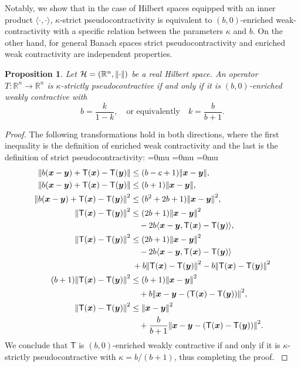\documentclass[journal,twoside,web]{ieeecolor}
\newcommand{\norm}[1]{{\left\vert\kern-0.25ex\left\vert #1\right\vert\kern-0.25ex\right\vert}}
\newcommand{\rea }{\mathbb{R}}
\newcommand{\xb}{\boldsymbol{x}}
\newcommand{\yb}{\boldsymbol{y}}
\newcommand{\Ts}{\mathsf{T}}
\newcommand{\Hc}{\mathcal{H}}
\newtheorem{prop}{Proposition}
\begin{document}
Notably, we show that in the case of Hilbert spaces equipped with an inner product $\langle\cdot,\cdot\rangle$, $\kappa$-strict pseudocontractivity is equivalent to $(b,0)$-enriched weak-contractivity with a specific relation between the parameters $\kappa$ and $b$. On the other hand, for general Banach spaces strict pseudocontractivity and enriched weak contractivity are independent properties. 
%
\begin{prop}\label{prop:eqKPSENE}
    Let $\Hc=(\rea^n,\norm{\cdot})$ be a real Hilbert space. An operator $T:\rea^n\rightarrow\rea^n$ is $\kappa$-strictly pseudocontractive if and only if it is $(b,0)$-enriched weakly contractive with
    $$
    b = \frac{k}{1-k},\quad \text{or equivalently} \quad k=\frac{b}{b+1}.
    $$
\end{prop}
%
\begin{proof}
%
The following transformations hold in both directions, where the first inequality is the definition of enriched weak contractivity and the last is the definition of strict pseudocontractivity:
\begingroup
\medmuskip=0mu
\thinmuskip=0mu
\thickmuskip=0mu
$$
\begin{aligned}
\norm{b(\xb-\yb)+\Ts(\xb)-\Ts(\yb)} & \leq (b-c+1)\norm{\xb-\yb},\\
\norm{b(\xb-\yb)+\Ts(\xb)-\Ts(\yb)} & \leq (b+1)\norm{\xb-\yb},\\
\norm{b(\xb-\yb)+\Ts(\xb)-\Ts(\yb)}^2 & \leq (b^2+2b+1)\norm{\xb-\yb}^2,\\
\norm{\Ts(\xb)-\Ts(\yb)}^2
& \leq (2b+1)\norm{\xb-\yb}^2 \\ & \quad -2b\langle \xb-\yb,\Ts(\xb)-\Ts(\yb)\rangle,\\
\norm{\Ts(\xb)-\Ts(\yb)}^2 & \leq (2b+1)\norm{\xb-\yb}^2\\
& \quad -2b\langle \xb-\yb,\Ts(\xb)-\Ts(\yb)\rangle\\
& \: + b \norm{\Ts(\xb)-\Ts(\yb)}^2 -b \norm{\Ts(\xb)-\Ts(\yb)}^2 \\
(b+1)\norm{\Ts(\xb)-\Ts(\yb)}^2 & \leq (b+1)\norm{\xb-\yb}^2 \\
& \quad + b\norm{\xb-\yb-(\Ts(\xb)-\Ts(\yb))}^2,\\
\norm{\Ts(\xb)-\Ts(\yb)}^2 & \leq \norm{\xb-\yb}^2 \\
& \quad + \frac{b}{b+1}\norm{\xb-\yb-(\Ts(\xb)-\Ts(\yb))}^2.\\
\end{aligned}
$$
We conclude that $\Ts$ is $(b,0)$-enriched weakly contractive if and only if it is $\kappa$-strictly pseudocontractive with $\kappa = b/(b+1)$, thus completing the proof.
\endgroup
\end{proof}
\end{document}
